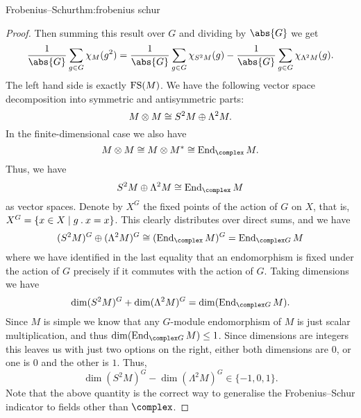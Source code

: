 \begin{thm}{Frobenius--Schur}{thm:frobenius schur}
\begin{proof}
        Then summing this result over \(G\) and dividing by \(\abs{G}\) we get
        \begin{equation}
            \frac{1}{\abs{G}} \sum_{g \in G} \chi_M(g^2) = \frac{1}{\abs{G}} \sum_{g \in G} \chi_{S^2M}(g) - \frac{1}{\abs{G}} \sum_{g \in G} \chi_{\Lambda^2 M}(g).
        \end{equation}
        The left hand side is exactly \(\operatorname{FS}(M)\).
        We have the following vector space decomposition into symmetric and antisymmetric parts:
        \begin{equation}
            M \otimes M \cong S^2M \oplus \Lambda^2M.
        \end{equation}
        In the finite-dimensional case we also have
        \begin{equation}
            M \otimes M \isomorphic M \otimes M^* \isomorphic \End_{\complex} M.
        \end{equation}
        Thus, we have
        \begin{equation}
            S^2M \oplus \Lambda^2M \isomorphic \End_{\complex} M
        \end{equation}
        as vector spaces.
        Denote by \(X^G\) the fixed points of the action of \(G\) on \(X\), that is, \(X^G = \{x \in X \mid g \mathbin{.} x = x\}\).
        This clearly distributes over direct sums, and we have
        \begin{equation}
            (S^2M)^G \oplus (\Lambda^2M)^G \isomorphic (\End_{\complex} M)^G = \End_{\complex G} M
        \end{equation}
        where we have identified in the last equality that an endomorphism is fixed under the action of \(G\) precisely if it commutes with the action of \(G\).
        Taking dimensions we have
        \begin{equation}
            \dim(S^2M)^G + \dim (\Lambda^2 M)^G = \dim (\End_{\complex G}M).
        \end{equation}
        Since \(M\) is simple we know that any \(G\)-module endomorphism of \(M\) is just scalar multiplication, and thus \(\dim(\End_{\complex G} M) \le 1\).
        Since dimensions are integers this leaves us with just two options on the right, either both dimensions are \(0\), or one is \(0\) and the other is \(1\).
        Thus, 
        \begin{equation}
            \dim(S^2M)^G - \dim(\Lambda^2M)^G \in \{-1, 0, 1\}.
        \end{equation}
        Note that the above quantity is the correct way to generalise the Frobenius--Schur indicator to fields other than \(\complex\).
        

\end{proof}
\end{thm}
